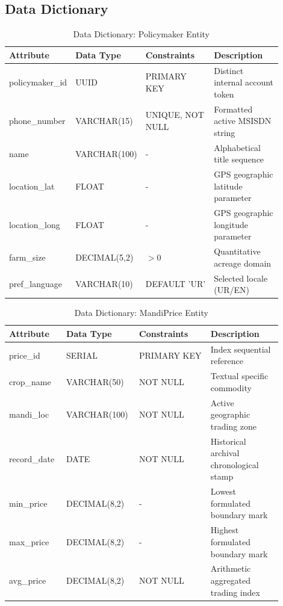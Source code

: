 \subsection{Data Dictionary}

\begin{table}[htbp]
  \centering
  \caption{Data Dictionary: Policymaker Entity}
  \label{tab:dict_farmer_table}
  \begin{tabular}{@{}p{0.2\linewidth} p{0.2\linewidth} p{0.25\linewidth} p{0.25\linewidth}@{}}
    \toprule
    \textbf{Attribute} & \textbf{Data Type} & \textbf{Constraints} & \textbf{Description} \\
    \midrule
    policymaker\_id & UUID & PRIMARY KEY & Distinct internal account token \\
    phone\_number & VARCHAR(15) & UNIQUE, NOT NULL & Formatted active MSISDN string \\
    name & VARCHAR(100) & - & Alphabetical title sequence \\
    location\_lat & FLOAT & - & GPS geographic latitude parameter \\
    location\_long & FLOAT & - & GPS geographic longitude parameter \\
    farm\_size & DECIMAL(5,2) & $> 0$ & Quantitative acreage domain \\
    pref\_language & VARCHAR(10) & DEFAULT 'UR' & Selected locale (UR/EN) \\
    \bottomrule
  \end{tabular}
\end{table}

\begin{table}[htbp]
  \centering
  \caption{Data Dictionary: MandiPrice Entity}
  \label{tab:dict_mandi_table}
  \begin{tabular}{@{}p{0.2\linewidth} p{0.2\linewidth} p{0.25\linewidth} p{0.25\linewidth}@{}}
    \toprule
    \textbf{Attribute} & \textbf{Data Type} & \textbf{Constraints} & \textbf{Description} \\
    \midrule
    price\_id & SERIAL & PRIMARY KEY & Index sequential reference \\
    crop\_name & VARCHAR(50) & NOT NULL & Textual specific commodity \\
    mandi\_loc & VARCHAR(100) & NOT NULL & Active geographic trading zone \\
    record\_date & DATE & NOT NULL & Historical archival chronological stamp \\
    min\_price & DECIMAL(8,2) & - & Lowest formulated boundary mark \\
    max\_price & DECIMAL(8,2) & - & Highest formulated boundary mark \\
    avg\_price & DECIMAL(8,2) & NOT NULL & Arithmetic aggregated trading index \\
    \bottomrule
  \end{tabular}
\end{table}

